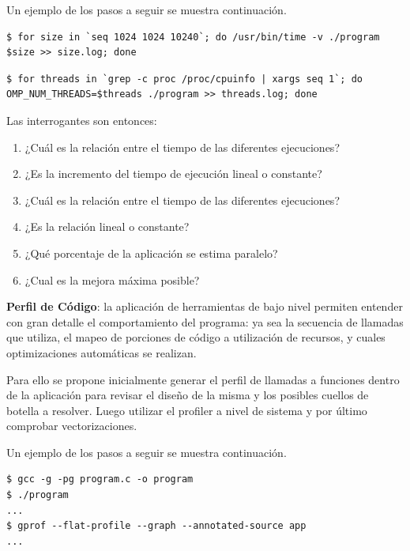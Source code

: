 \documentclass[a4paper]{report}
\begin{document}
\bigskip

Un ejemplo de los pasos a seguir se muestra continuación.

\begin{lstlisting}[caption={Escalamiento de Problema},label={lst:size}]
$ for size in `seq 1024 1024 10240`; do /usr/bin/time -v ./program $size >> size.log; done
\end{lstlisting}

\begin{lstlisting}[caption={Escalamiento de Cómputo},label={lst:proc}]
$ for threads in `grep -c proc /proc/cpuinfo | xargs seq 1`; do OMP_NUM_THREADS=$threads ./program >> threads.log; done
\end{lstlisting}

Las interrogantes son entonces:

\begin{enumerate}
\item ¿Cuál es la relación entre el tiempo de las diferentes ejecuciones?
\item ¿Es la incremento del tiempo de ejecución lineal o constante?
\item ¿Cuál es la relación entre el tiempo de las diferentes ejecuciones?
\item ¿Es la relación lineal o constante?
\item ¿Qué porcentaje de la aplicación se estima paralelo?
\item ¿Cual es la mejora máxima posible?
\end{enumerate}

\bigskip

{\bf Perfil de Código}: la aplicación de herramientas de bajo nivel permiten entender con gran detalle el comportamiento del programa: ya sea la secuencia de llamadas que utiliza, el mapeo de porciones de código a utilización de recursos, y cuales optimizaciones automáticas se realizan.

\bigskip

Para ello se propone inicialmente generar el perfil de llamadas a funciones dentro de la aplicación para revisar el diseño de la misma y los posibles cuellos de botella a resolver. Luego utilizar el profiler a nivel de sistema y por último comprobar vectorizaciones.

\bigskip

Un ejemplo de los pasos a seguir se muestra continuación.

\begin{lstlisting}[caption={Generación de Perfil de Rendimiento},label={lst:gprofall}]
$ gcc -g -pg program.c -o program
$ ./program
...
$ gprof --flat-profile --graph --annotated-source app
...
\end{lstlisting}
\end{document}
